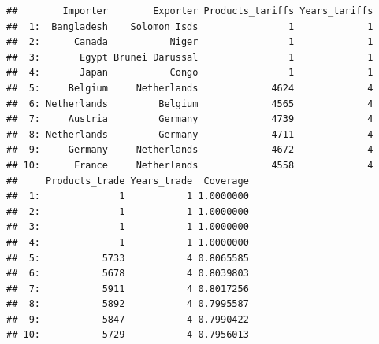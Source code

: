\documentclass[10pt,]{article}
\newenvironment{Shaded}{\begin{snugshade}}{\end{snugshade}}
\newcommand{\KeywordTok}[1]{\textcolor[rgb]{0.13,0.29,0.53}{\textbf{{#1}}}}
\newcommand{\DataTypeTok}[1]{\textcolor[rgb]{0.13,0.29,0.53}{{#1}}}
\newcommand{\DecValTok}[1]{\textcolor[rgb]{0.00,0.00,0.81}{{#1}}}
\newcommand{\StringTok}[1]{\textcolor[rgb]{0.31,0.60,0.02}{{#1}}}
\newcommand{\NormalTok}[1]{{#1}}
\begin{document}
\begin{Shaded}
\end{Shaded}

\begin{verbatim}
##        Importer        Exporter Products_tariffs Years_tariffs
##  1:  Bangladesh    Solomon Isds                1             1
##  2:      Canada           Niger                1             1
##  3:       Egypt Brunei Darussal                1             1
##  4:       Japan           Congo                1             1
##  5:     Belgium     Netherlands             4624             4
##  6: Netherlands         Belgium             4565             4
##  7:     Austria         Germany             4739             4
##  8: Netherlands         Germany             4711             4
##  9:     Germany     Netherlands             4672             4
## 10:      France     Netherlands             4558             4
##     Products_trade Years_trade  Coverage
##  1:              1           1 1.0000000
##  2:              1           1 1.0000000
##  3:              1           1 1.0000000
##  4:              1           1 1.0000000
##  5:           5733           4 0.8065585
##  6:           5678           4 0.8039803
##  7:           5911           4 0.8017256
##  8:           5892           4 0.7995587
##  9:           5847           4 0.7990422
## 10:           5729           4 0.7956013
\end{verbatim}
\end{document}
